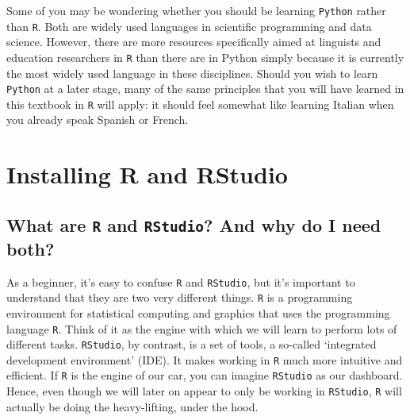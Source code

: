 \documentclass[
  letterpaper,
  DIV=11,
  numbers=noendperiod,
  oneside]{scrreprt}
\begin{document}
Some of you may be wondering whether you should be learning
\texttt{Python} rather than \texttt{R}. Both are widely used languages
in scientific programming and data science. However, there are more
resources specifically aimed at linguists and education researchers in
\texttt{R} than there are in Python simply because it is currently the
most widely used language in these disciplines. Should you wish to learn
\texttt{Python} at a later stage, many of the same principles that you
will have learned in this textbook in \texttt{R} will apply: it should
feel somewhat like learning Italian when you already speak Spanish or
French.

\section{Installing R and RStudio}\label{installing-r-and-rstudio-1}

\subsection{\texorpdfstring{What are \texttt{R} and \texttt{RStudio}?
And why do I need
both?}{What are R and RStudio? And why do I need both?}}\label{what-are-r-and-rstudio-and-why-do-i-need-both}

As a beginner, it's easy to confuse \texttt{R} and \texttt{RStudio}, but
it's important to understand that they are two very different things.
\texttt{R} is a programming environment for statistical computing and
graphics that uses the programming language \texttt{R}. Think of it as
the engine with which we will learn to perform lots of different tasks.
\texttt{RStudio}, by contrast, is a set of tools, a so-called
`integrated development environment' (IDE). It makes working in
\texttt{R} much more intuitive and efficient. If \texttt{R} is the
engine of our car, you can imagine \texttt{RStudio} as our dashboard.
Hence, even though we will later on appear to only be working in
\texttt{RStudio}, \texttt{R} will actually be doing the heavy-lifting,
under the hood.
\end{document}
